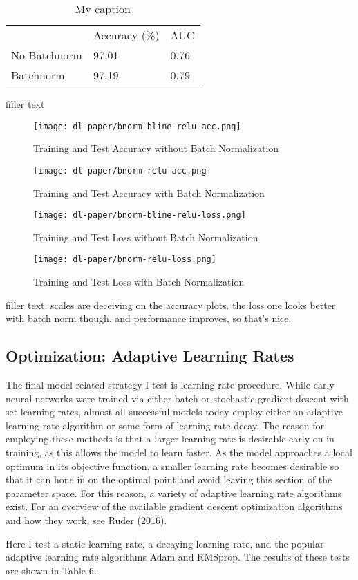 \documentclass[12pt]{article}  %
\theoremstyle{definition}
\theoremstyle{remark}
\begin{document}
\begin{table}[!h]
\centering
\caption{My caption}
\label{my-label}
\begin{tabular}{lll}
             & Accuracy (\%) & AUC  \\
No Batchnorm & 97.01         & 0.76 \\
Batchnorm    & 97.19         & 0.79
\end{tabular}
\end{table}

\par filler text 

\begin{figure}[!h]
  \texttt{[image: dl-paper/bnorm-bline-relu-acc.png]}
  \caption{Training and Test Accuracy without Batch Normalization}\label{no-bn-acc}
\endminipage\hfill
{}
  \texttt{[image: dl-paper/bnorm-relu-acc.png]}
  \caption{Training and Test Accuracy with Batch Normalization}\label{bn-acc}
\endminipage\hfill
\end{figure}

\begin{figure}[!h]
  \texttt{[image: dl-paper/bnorm-bline-relu-loss.png]}
  \caption{Training and Test Loss without Batch Normalization}\label{no-bn-loss}
\endminipage\hfill
{}
  \texttt{[image: dl-paper/bnorm-relu-loss.png]}
  \caption{Training and Test Loss with Batch Normalization}\label{bn-loss}
\endminipage\hfill
\end{figure}

\par filler text. scales are deceiving on the accuracy plots. the loss one looks better with batch norm though. and performance improves, so that's nice. 

\subsection{Optimization: Adaptive Learning Rates}
\par The final model-related strategy I test is learning rate procedure. While early neural networks were trained via either batch or stochastic gradient descent with set learning rates, almost all successful models today employ either an adaptive learning rate algorithm or some form of learning rate decay. The reason for employing these methods is that a larger learning rate is desirable early-on in training, as this allows the model to learn faster. As the model approaches a local optimum in its objective function, a smaller learning rate becomes desirable so that it can hone in on the optimal point and avoid leaving this section of the parameter space. For this reason, a variety of adaptive learning rate algorithms exist. For an overview of the available gradient descent optimization algorithms and how they work, see Ruder (2016). 
\par Here I test a static learning rate, a decaying learning rate, and the popular adaptive learning rate algorithms Adam and RMSprop. The results of these tests are shown in Table 6. 
\end{document}
